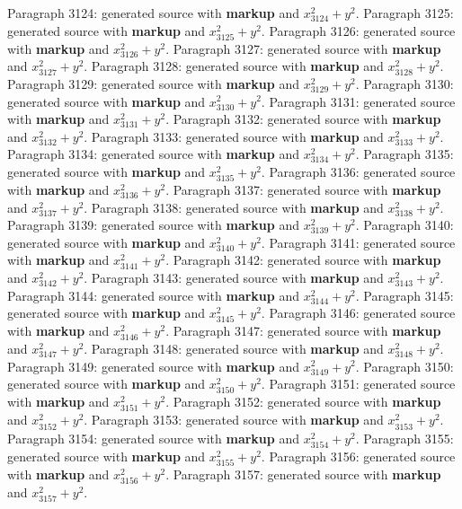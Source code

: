 \documentclass{article}
\begin{document}
Paragraph 3124: generated source with \textbf{markup} and $x_{3124}^2 + y^2$.
Paragraph 3125: generated source with \textbf{markup} and $x_{3125}^2 + y^2$.
Paragraph 3126: generated source with \textbf{markup} and $x_{3126}^2 + y^2$.
Paragraph 3127: generated source with \textbf{markup} and $x_{3127}^2 + y^2$.
Paragraph 3128: generated source with \textbf{markup} and $x_{3128}^2 + y^2$.
Paragraph 3129: generated source with \textbf{markup} and $x_{3129}^2 + y^2$.
Paragraph 3130: generated source with \textbf{markup} and $x_{3130}^2 + y^2$.
Paragraph 3131: generated source with \textbf{markup} and $x_{3131}^2 + y^2$.
Paragraph 3132: generated source with \textbf{markup} and $x_{3132}^2 + y^2$.
Paragraph 3133: generated source with \textbf{markup} and $x_{3133}^2 + y^2$.
Paragraph 3134: generated source with \textbf{markup} and $x_{3134}^2 + y^2$.
Paragraph 3135: generated source with \textbf{markup} and $x_{3135}^2 + y^2$.
Paragraph 3136: generated source with \textbf{markup} and $x_{3136}^2 + y^2$.
Paragraph 3137: generated source with \textbf{markup} and $x_{3137}^2 + y^2$.
Paragraph 3138: generated source with \textbf{markup} and $x_{3138}^2 + y^2$.
Paragraph 3139: generated source with \textbf{markup} and $x_{3139}^2 + y^2$.
Paragraph 3140: generated source with \textbf{markup} and $x_{3140}^2 + y^2$.
Paragraph 3141: generated source with \textbf{markup} and $x_{3141}^2 + y^2$.
Paragraph 3142: generated source with \textbf{markup} and $x_{3142}^2 + y^2$.
Paragraph 3143: generated source with \textbf{markup} and $x_{3143}^2 + y^2$.
Paragraph 3144: generated source with \textbf{markup} and $x_{3144}^2 + y^2$.
Paragraph 3145: generated source with \textbf{markup} and $x_{3145}^2 + y^2$.
Paragraph 3146: generated source with \textbf{markup} and $x_{3146}^2 + y^2$.
Paragraph 3147: generated source with \textbf{markup} and $x_{3147}^2 + y^2$.
Paragraph 3148: generated source with \textbf{markup} and $x_{3148}^2 + y^2$.
Paragraph 3149: generated source with \textbf{markup} and $x_{3149}^2 + y^2$.
Paragraph 3150: generated source with \textbf{markup} and $x_{3150}^2 + y^2$.
Paragraph 3151: generated source with \textbf{markup} and $x_{3151}^2 + y^2$.
Paragraph 3152: generated source with \textbf{markup} and $x_{3152}^2 + y^2$.
Paragraph 3153: generated source with \textbf{markup} and $x_{3153}^2 + y^2$.
Paragraph 3154: generated source with \textbf{markup} and $x_{3154}^2 + y^2$.
Paragraph 3155: generated source with \textbf{markup} and $x_{3155}^2 + y^2$.
Paragraph 3156: generated source with \textbf{markup} and $x_{3156}^2 + y^2$.
Paragraph 3157: generated source with \textbf{markup} and $x_{3157}^2 + y^2$.
\end{document}
